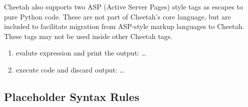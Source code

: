 Cheetah also supports two ASP (Active Server Pages) style tags as escapes to
pure Python code. These are not part of Cheetah's core language, but are
included to facilitate migration from ASP-style markup languages to Cheetah.
These tags may not be used inside other Cheetah tags.
\begin{enumerate}
\item evalute expression and print the output: \code{<\%=} \ldots \code{\%>} 
\item execute code and discard output: \code{<\%} \ldots \code{\%>}
\end{enumerate}


\subsection{Placeholder Syntax Rules}
\label{language.placeholdersRules}

